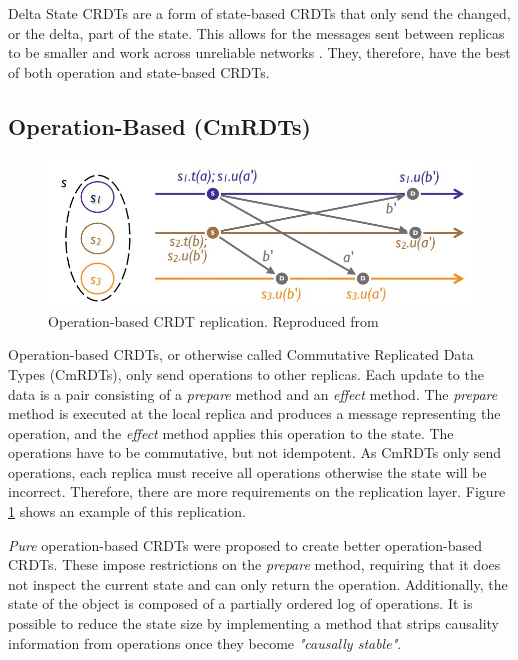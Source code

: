 \documentclass[12pt]{report}
\begin{document}
Delta State CRDTs are a form of state-based CRDTs that only send the changed, or the delta, part of the state. This allows for the messages sent between replicas to be smaller and work across unreliable networks \cite{Almeida_2018}. They, therefore, have the best of both operation and state-based CRDTs.


\subsection{Operation-Based (CmRDTs)}

\begin{figure}
    \centering
    \includegraphics[width=8 cm]{operation.jpg}
    \caption{Operation-based CRDT replication. Reproduced from \cite{10.1007/978-3-642-24550-3_29}}
    \label{fig:operation}
\end{figure}

Operation-based CRDTs, or otherwise called Commutative Replicated Data Types (CmRDTs), only send operations to other replicas. Each update to the data is a pair consisting of a \textit{prepare} method and an \textit{effect} method. The \textit{prepare} method is executed at the local replica and produces a message representing the operation, and the \textit{effect} method applies this operation to the state\cite{10.1007/978-3-642-24550-3_29}. The operations have to be commutative, but not idempotent. As CmRDTs only send operations, each replica must receive all operations otherwise the state will be incorrect. Therefore, there are more requirements on the replication layer. Figure \ref{fig:operation} shows an example of this replication. \par

\textit{Pure} operation-based CRDTs were proposed to create better operation-based CRDTs\cite{10.1007/978-3-662-43352-2_11}. These impose restrictions on the \textit{prepare} method, requiring that it does not inspect the current state and can only return the operation. Additionally, the state of the object is composed of a partially ordered log of operations. It is possible to reduce the state size by implementing a method that strips causality information from operations once they become \textit{"causally stable"}\cite{10.1007/978-3-662-43352-2_11}.
\end{document}
